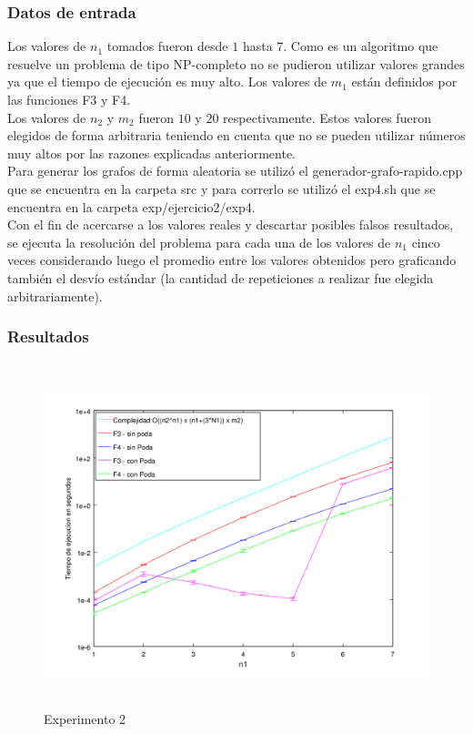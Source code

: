 \subsubsection*{Datos de entrada}\;
\noindent Los valores de $n_1$ tomados fueron desde $1$ hasta $7$. Como es un algoritmo que resuelve un problema de tipo NP-completo no se pudieron utilizar valores grandes ya que el tiempo de ejecución es muy alto. Los valores de $m_1$ están definidos por las funciones F3 y F4.\\
       Los valores de $n_2$ y $m_2$ fueron $10$ y $20$ respectivamente. Estos valores fueron elegidos de forma arbitraria teniendo en cuenta que no se pueden utilizar números muy altos por las razones explicadas anteriormente.\\
        Para generar los grafos de forma aleatoria se utilizó el generador-grafo-rapido.cpp que se encuentra en la carpeta src y para correrlo se utilizó el exp4.sh que se encuentra en la carpeta exp/ejercicio2/exp4. \\
        Con el fin de acercarse a los valores reales y descartar posibles falsos resultados, se ejecuta la resolución del problema para cada una de los valores de $n_1$ cinco veces considerando luego el promedio entre los valores obtenidos pero graficando también el desvío estándar (la cantidad de repeticiones a realizar fue elegida arbitrariamente).\; 
        
\subsubsection*{Resultados}\;

    \begin{figure}[H]
      \includegraphics[height=10cm]{graficos/ejercicio2-exp4.png}
       \caption{Experimento 2}
	\end{figure}
